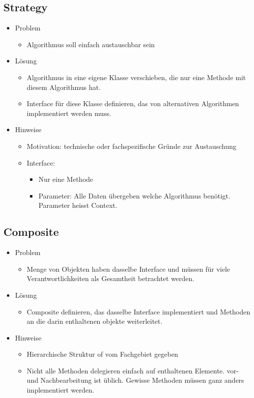 \documentclass[../ZF_SWEN1.tex]{subfiles}
\begin{document}
\subsection{Strategy}
\begin{itemize}
	\item Problem
	\begin{itemize}
		\item Algorithmus soll einfach austauschbar sein
	\end{itemize}
	\item Lösung
	\begin{itemize}
		\item Algorithmus in eine eigene Klasse verschieben, die nur eine Methode mit diesem Algorithmus hat.
		\item Interface für diese Klasse definieren, das von alternativen Algorithmen implementiert werden muss.
	\end{itemize}
	\item Hinweise
	\begin{itemize}
		\item Motivation: technische oder fachspezifische Gründe zur Austauschung
		\item Interface:
		\begin{itemize}
			\item Nur eine Methode
			\item Parameter: Alle Daten übergeben welche Algorithmus benötigt. Parameter heisst Context.
		\end{itemize}
	\end{itemize}
\end{itemize}



\subsection{Composite}
\begin{itemize}
	\item Problem
	\begin{itemize}
		\item Menge von Objekten haben dasselbe Interface und müssen für viele Verantwortlichkeiten als Gesamtheit betrachtet werden.
	\end{itemize}
	\item Lösung
	\begin{itemize}
		\item Composite definieren, das dasselbe Interface implementiert und Methoden an die darin enthaltenen objekte weiterleitet.
	\end{itemize}
	\item Hinweise
	\begin{itemize}
		\item Hierarchische Struktur of vom Fachgebiet gegeben
		\item Nicht alle Methoden delegieren einfach auf enthaltenen Elemente. vor- und Nachbearbeitung ist üblich. Gewisse Methoden müssen ganz anders implementiert werden.
	\end{itemize}
\end{itemize}
\end{document}
